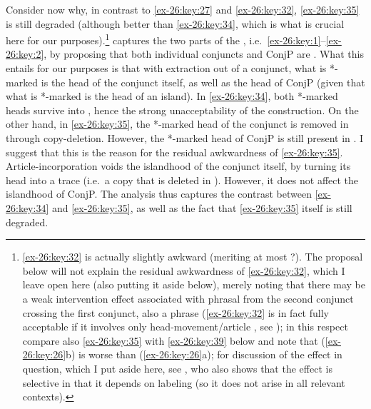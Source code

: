 \documentclass[output=paper]{langsci/langscibook}
\begin{document}
Consider now why, in contrast to \eqref{ex-26:key:27} and \eqref{ex-26:key:32}, \eqref{ex-26:key:35} is still degraded
(although better than \eqref{ex-26:key:34}, which is what is crucial here for our
purposes).\footnote{\eqref{ex-26:key:32} is actually slightly awkward (meriting at most ?).
    The proposal below will not explain the residual awkwardness of \eqref{ex-26:key:32}, which
    I leave open here (also putting it aside below), merely noting that there
    may be a weak intervention effect associated with phrasal  from the
    second conjunct crossing the first conjunct, also a phrase (\eqref{ex-26:key:32} is in fact
    fully acceptable if it involves only head-movement/article ,
    see \citealt{Boskovic2013b}); in this respect compare also \eqref{ex-26:key:35} with \eqref{ex-26:key:39}
    below and note that (\ref{ex-26:key:26}b) is worse than (\ref{ex-26:key:26}a); for discussion of the effect
in question, which I put aside here, see \textcite{Boskovicinprep}, who also
shows that the effect is selective in that it depends on labeling (so it does
not arise in all relevant contexts).} \textcite{Odainpress} captures the two
parts of the , i.e.\ \eqref{ex-26:key:1}--\eqref{ex-26:key:2}, by proposing that both individual
conjuncts and ConjP are . What this entails for our purposes is that
with extraction out of a conjunct, what is *-marked is the head of the conjunct
itself, as well as the head of ConjP (given that what is *-marked is the head
of an island). In \eqref{ex-26:key:34}, both *-marked heads survive into
, hence the strong unacceptability of the construction. On the
other hand, in \eqref{ex-26:key:35}, the *-marked head of the conjunct is
removed in  through copy-deletion. However, the *-marked head
of ConjP is still present in . I suggest that this is the
reason for the residual awkwardness of \eqref{ex-26:key:35}.
Article-incorporation voids the islandhood of the conjunct itself, by turning
its head into a trace (i.e.\ a copy that is deleted in ).
However, it does not affect the islandhood of ConjP. The analysis
thus captures the contrast between \eqref{ex-26:key:34} and
\eqref{ex-26:key:35}, as well as the fact that \eqref{ex-26:key:35} itself is
still degraded.
\end{document}
